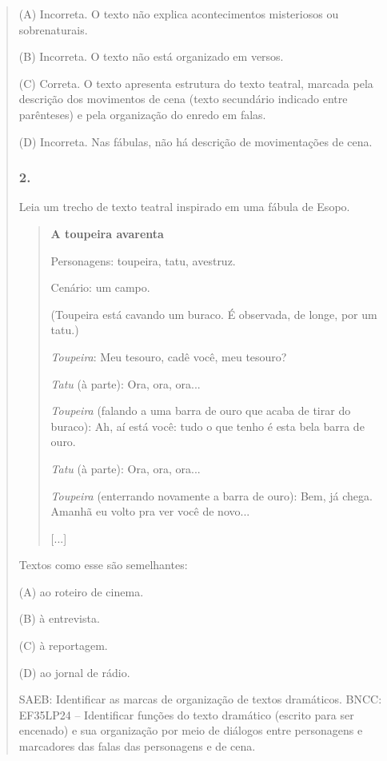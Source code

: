 \begin{quote}
(A) Incorreta. O texto não explica acontecimentos misteriosos ou
sobrenaturais.

(B) Incorreta. O texto não está organizado em versos.

(C) Correta. O texto apresenta estrutura do texto teatral, marcada pela
descrição dos movimentos de cena (texto secundário indicado entre
parênteses) e pela organização do enredo em falas.

(D) Incorreta. Nas fábulas, não há descrição de movimentações de cena.

\subsubsection{2. }\label{section-30}

Leia um trecho de texto teatral inspirado em uma fábula de Esopo.

\begin{quote}
\textbf{A toupeira avarenta}

Personagens: toupeira, tatu, avestruz.

Cenário: um campo.

(Toupeira está cavando um buraco. É observada, de longe, por um tatu.)

\emph{Toupeira}: Meu tesouro, cadê você, meu tesouro?

\emph{Tatu} (à parte): Ora, ora, ora...

\emph{Toupeira} (falando a uma barra de ouro que acaba de tirar do
buraco): Ah, aí está você: tudo o que tenho é esta bela barra de ouro.

\emph{Tatu} (à parte): Ora, ora, ora...

\emph{Toupeira} (enterrando novamente a barra de ouro): Bem, já chega.
Amanhã eu volto pra ver você de novo...

{[}...{]}

\end{quote}

Textos como esse são semelhantes:

(A) ao roteiro de cinema.

(B) à entrevista.

(C) à reportagem.

(D) ao jornal de rádio.

SAEB: Identificar as marcas de organização de textos dramáticos.
BNCC: EF35LP24 -- Identificar funções do texto dramático (escrito para
ser encenado) e sua organização por meio de diálogos entre personagens e
marcadores das falas das personagens e de cena.


\end{quote}
